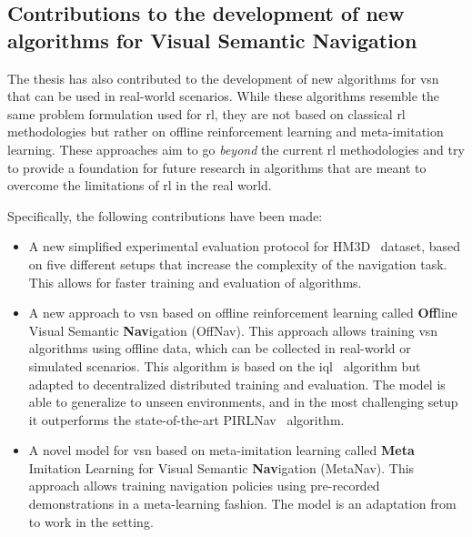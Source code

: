 \subsection{Contributions to the development of new algorithms for Visual Semantic Navigation}\label{subsec:contributions-to-new-algorithms-for-visual-semantic-navigation}

The thesis has also contributed to the development of new algorithms for \acrshort{vsn} that can be used in real-world scenarios.
While these algorithms resemble the same problem formulation used for \acrshort{rl}, they are not based on classical \acrshort{rl} methodologies but rather on offline reinforcement learning and meta-imitation learning.
These approaches aim to go \textit{beyond} the current \acrshort{rl} methodologies and try to provide a foundation for future research in algorithms that are meant to overcome the limitations of \acrshort{rl} in the real world.

Specifically, the following contributions have been made:

\begin{itemize}
    \item A new simplified experimental evaluation protocol for HM3D~\cite{ramakrishnan2021} dataset, based on five different setups that increase the complexity of the navigation task.
    This allows for faster training and evaluation of algorithms.
    \item A new approach to \acrshort{vsn} based on offline reinforcement learning called \textbf{Off}line Visual Semantic \textbf{Nav}igation (OffNav).
    This approach allows training \acrshort{vsn} algorithms using offline data, which can be collected in real-world or simulated scenarios.
    This algorithm is based on the \acrfull{iql}~\cite{kostrikov2022offline} algorithm but adapted to decentralized distributed training and evaluation.
    The model is able to generalize to unseen environments, and in the most challenging setup it outperforms the state-of-the-art PIRLNav~\cite{ramrakhya2023} algorithm.
    \item A novel model for \acrshort{vsn} based on meta-imitation learning called \textbf{Meta} Imitation Learning for Visual Semantic \textbf{Nav}igation (MetaNav).
    This approach allows training navigation policies using pre-recorded demonstrations in a meta-learning fashion.
    The model is an adaptation from~\cite{finnOneShotVisualImitation2017} to work in the \objnav setting.
\end{itemize}

